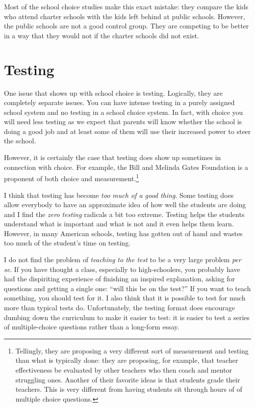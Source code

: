Most of the school choice studies make this exact mistake: they compare the
kids who attend charter schools with the kids left behind at public schools.
However, the public schools are not a good control group. They are competing to
be better in a way that they would not if the charter schools did not exist.

\section{Testing}


One issue that shows up with school choice is testing. Logically, they are
completely separate issues. You can have intense testing in a purely assigned
school system and no testing in a school choice system. In fact, with choice
you will need less testing as we expect that parents will know whether the
school is doing a good job and at least some of them will use their increased
power to steer the school.

However, it is certainly the case that testing does show up sometimes in
connection with choice. For example, the Bill and Melinda Gates Foundation is a
proponent of both choice and measurement.\footnote{Tellingly, they are
proposing a very different sort of measurement and testing than what is
typically done: they are proposing, for example, that teacher effectiveness be
evaluated by other teachers who then coach and mentor struggling ones. Another
of their favorite ideas is that students grade their teachers. This is very
different from having students sit through hours of of multiple choice
questions.}

I think that testing has become \emph{too much of a good thing}. Some testing
does allow everybody to have an approximate idea of how well the students are
doing and I find the \emph{zero testing} radicals a bit too extreme. Testing
helps the students understand what is important and what is not and it even
helps them learn.  However, in many
American schools, testing has gotten out of hand and wastes too much of
the student's time on testing.

I do not find the problem of \emph{teaching to the test} to be a very large
problem \emph{per se}. If you have thought a class, especially to
high-schoolers, you probably have had the dispiriting experience of finishing
an inspired explanation, asking for questions and getting a single one: ``will
this be on the test?'' If you want to teach something, you should test for it.
I also think that it is possible to test for much more than typical tests do.
Unfortunately, the testing format does encourage dumbing down the curriculum to
make it easier to test: it is easier to test a series of multiple-choice
questions rather than a long-form essay.

